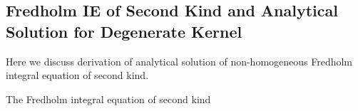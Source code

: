 \begin{appendix}
\appendixpage
\chapter{}
\pagestyle{empty}
\section{\label{apen:derivationdegenerate}Fredholm IE of Second Kind and Analytical Solution for Degenerate Kernel}
\label{appendix-1}
Here we discuss derivation of analytical solution of non-homogeneous Fredholm integral equation of second kind.


The Fredholm integral equation of second kind


\end{appendix}
